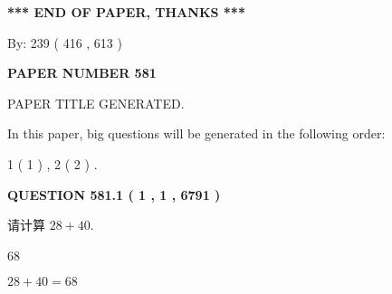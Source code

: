 \documentclass{ctexart}
\begin{document}
   
   
   
\vspace{1.0in} 
{\textbf{\large{ *** END OF PAPER, THANKS *** }}} 
   
   
\hspace{1.0in} By: 
 239 ( 416 ,  613 )
   
   
   
   
\newpage 
\setcounter{page}{ 
   581001 } 
   
   
   
   
 {\textbf{ \Large{ PAPER NUMBER  581  }}}
   
   
\vspace{0.2in}
   
   
   
   
   
   
   
   
 \vspace{0.2in}
 
 
 
 
   
   
 PAPER TITLE GENERATED.
   
   
   
\vspace{0.2in}
   
In this paper, big questions will be generated in the following order: 
   
   
   1 ( 1 )
 ,
   2 ( 2 )
 .
  
\vspace{0.2in}
  
{\textbf{\Large{QUESTION
581.1 
 ( 1 , 1 , 6791 )
}}}
  
  
 
请计算 $ %
28 +  %
40 $.
 
 
 
\noindent{}
 
 

68
 
 
\noindent{}
 
 

 
 
 
\noindent{}
 
 

$ %
28 +  %
40=   %
68$
 
\end{document}
